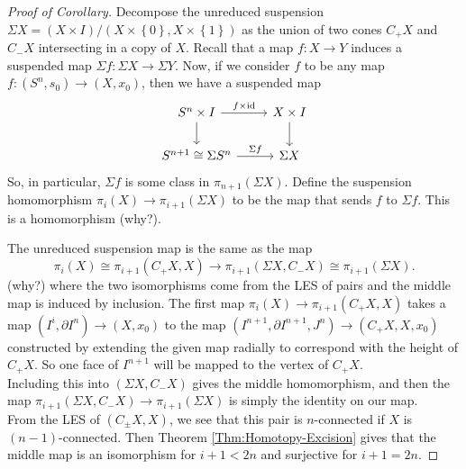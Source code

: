 \begin{proof}[Proof of Corollary]
    Decompose the unreduced suspension
    $\Sigma X = 
    (X \times I) / \left( 
    X \times \left\{ 0 \right\} ,
X \times \left\{ 1 \right\} \right) $ as the
    union of two cones
    $C_+ X$ and $C_{-}X$ intersecting in a 
    copy of $X$.
    Recall that a map
    $f\colon X \to Y$ induces a suspended map
    $\Sigma f \colon \Sigma X \to \Sigma Y$. Now,
    if we consider 
    $f$ to be any map
    $f \colon \left( S^{n},s_0 \right) \to 
    \left( X, x_0 \right) $, then
    we have
    a suspended map
    \begin{equation*}
    \begin{tikzcd}
        S^{n} \times I \ar[r, "f \times \id"]
        \ar[d] & X \times I \ar[d] \\
        S^{n+1} \cong \Sigma S^{n} \ar[r, "\Sigma f"] & \Sigma X
    \end{tikzcd}
    \end{equation*}
    So, in particular,
    $\Sigma f$ is some class
    in $\pi_{n+1} \left( \Sigma X \right) $.
    Define the suspension homomorphism
    $\pi_i (X) \to \pi_{i+1}\left( \Sigma X \right) $ 
    to be the map that sends
    $f$ to $\Sigma f$. This is a homomorphism (why?).

    The unreduced suspension map is the same
    as the map
    \[
    \pi_i (X) \cong
    \pi_{i+1} \left( C_+ X, X \right) 
    \to \pi_{i+1} (\Sigma X, C_{-}X) \cong
    \pi_{i+1} \left( \Sigma X \right) .
    \] 
    (why?) where the two isomorphisms come
    from the LES of pairs and the middle
    map is induced by inclusion.
    The first map
    $\pi_i (X) \to \pi_{i+1}(C_+ X, X)$ 
    takes a map
    $\left( I^{i}, \partial I^{n} \right) 
    \to \left( X, x_0 \right) $ 
    to the map
    $\left( I^{n+1}, \partial I^{n+1},
    J^{n}\right) \to \left( C_+ X, X, x_0 \right) $
    constructed by extending
    the given map radially to correspond with the
    height of $C_{+}X$. So one face of
    $I^{n+1}$ will be mapped to the vertex of
    $C_{+}X$.\\

    Including this into
    $\left( \Sigma X, C_{-}X \right) $ gives
    the middle homomorphism, and
    then the map
    $\pi_{i+1} \left( \Sigma X, C_{-}X \right) \to 
    \pi_{i+1}(\Sigma X)$ is simply the identity on
    our map. \\
    From the LES of $\left( C_{\pm }X, X \right) $, we
    see that this pair is $n$-connected
    if $X$ is $(n-1)$-connected. Then
    Theorem \ref{Thm:Homotopy-Excision} gives
    that the middle map is an isomorphism
    for $i+1 < 2n$ and surjective for
    $i+1 = 2n$.

\end{proof}



